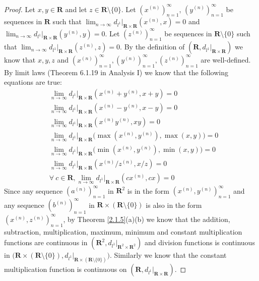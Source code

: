 \begin{proof}
    Let \(x, y \in \mathbf{R}\) and let \(z \in \mathbf{R} \setminus \{0\}\).
    Let \((x^{(n)})_{n = 1}^\infty\), \((y^{(n)})_{n = 1}^\infty\) be sequences in \(\mathbf{R}\) such that \(\lim_{n \to \infty} d_{l^1}|_{\mathbf{R} \times \mathbf{R}}(x^{(n)}, x) = 0\) and \(\lim_{n \to \infty} d_{l^1}|_{\mathbf{R} \times \mathbf{R}}(y^{(n)}, y) = 0\).
    Let \((z^{(n)})_{n = 1}^\infty\) be sequences in \(\mathbf{R} \setminus \{0\}\) such that \(\lim_{n \to \infty} d_{l^1}|_{\mathbf{R} \times \mathbf{R}}(z^{(n)}, z) = 0\).
    By the definition of \((\mathbf{R}, d_{l^1}|_{\mathbf{R} \times \mathbf{R}})\) we know that \(x, y, z\) and \((x^{(n)})_{n = 1}^\infty, (y^{(n)})_{n = 1}^\infty, (z^{(n)})_{n = 1}^\infty\) are well-defined.
    By limit laws (Theorem 6.1.19 in Analysis I) we know that the following equations are true:
    \begin{align*}
         & \lim_{n \to \infty} d_{l^1}|_{\mathbf{R} \times \mathbf{R}}(x^{(n)} + y^{(n)}, x + y) = 0                   \\
         & \lim_{n \to \infty} d_{l^1}|_{\mathbf{R} \times \mathbf{R}}(x^{(n)} - y^{(n)}, x - y) = 0                   \\
         & \lim_{n \to \infty} d_{l^1}|_{\mathbf{R} \times \mathbf{R}}(x^{(n)} y^{(n)}, xy) = 0                        \\
         & \lim_{n \to \infty} d_{l^1}|_{\mathbf{R} \times \mathbf{R}}\big(\max(x^{(n)}, y^{(n)}), \max(x, y)\big) = 0 \\
         & \lim_{n \to \infty} d_{l^1}|_{\mathbf{R} \times \mathbf{R}}\big(\min(x^{(n)}, y^{(n)}), \min(x, y)\big) = 0 \\
         & \lim_{n \to \infty} d_{l^1}|_{\mathbf{R} \times \mathbf{R}}(x^{(n)} / z^{(n)}, x / z) = 0                   \\
         & \forall\ c \in \mathbf{R}, \lim_{n \to \infty} d_{l^1}|_{\mathbf{R} \times \mathbf{R}}(cx^{(n)}, cx) = 0
    \end{align*}
    Since any sequence \((a^{(n)})_{n = 1}^\infty\) in \(\mathbf{R}^2\) is in the form \((x^{(n)}, y^{(n)})_{n = 1}^\infty\) and any sequence \((b^{(n)})_{n = 1}^\infty\) in \(\mathbf{R} \times (\mathbf{R} \setminus \{0\})\) is also in the form \((x^{(n)}, z^{(n)})_{n = 1}^\infty\), by Theorem \ref{2.1.5}(a)(b) we know that the addition, subtraction, multiplication, maximum, minimum and constant multiplication functions are continuous in \((\mathbf{R}^2, d_{l^1}|_{\mathbf{R}^2 \times \mathbf{R}^2})\) and division functions is continuous in \(\big(\mathbf{R} \times (\mathbf{R} \setminus \{0\}), d_{l^1}|_{\mathbf{R} \times (\mathbf{R} \setminus \{0\})}\big)\).
    Similarly we know that the constant multiplication function is continuous on \((\mathbf{R}, d_{l^1}|_{\mathbf{R} \times \mathbf{R}})\).
\end{proof}